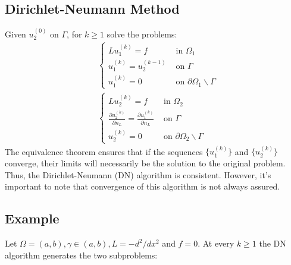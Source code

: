 \documentclass[11pt]{book}
\begin{document}
\subsection*{Dirichlet-Neumann Method}
Given $u_{2}^{(0)}$ on $\Gamma$, for $k \geq 1$ solve the problems:
$$
\begin{aligned}
& \begin{cases}L u_{1}^{(k)}=f & \text { in } \Omega_{1} \\
u_{1}^{(k)}=u_{2}^{(k-1)} & \text { on } \Gamma \\
u_{1}^{(k)}=0 & \text { on } \partial \Omega_{1} \backslash \Gamma\end{cases} \\
& \begin{cases}L u_{2}^{(k)}=f & \text { in } \Omega_{2} \\
\frac{\partial u_{2}^{(k)}}{\partial n_{L}}=\frac{\partial u_{1}^{(k)}}{\partial n_{L}} & \text { on } \Gamma \\
u_{2}^{(k)}=0 & \text { on } \partial \Omega_{2} \backslash \Gamma\end{cases}
\end{aligned}
$$
The equivalence theorem ensures that if the sequences $\{u_{1}^{(k)}\}$ and $\{u_{2}^{(k)}\}$ converge, their limits will necessarily be the solution to the original problem. Thus, the Dirichlet-Neumann (DN) algorithm is consistent. However, it's important to note that convergence of this algorithm is not always assured.


\subsection*{Example}
Let $\Omega=(a, b), \gamma \in(a, b), L=-d^{2} / d x^{2}$ and $f=0$. At every $k \geq 1$ the DN algorithm generates the two subproblems:
\end{document}
